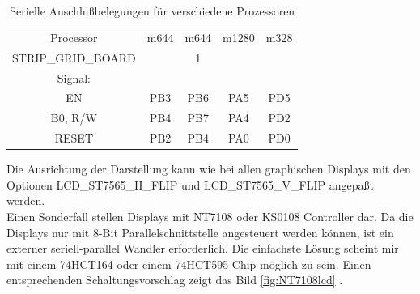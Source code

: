 \begin{table}[H]
  \begin{center}
    \begin{tabular}{| c || c | c | c | c |}
    \hline
 Processor  & m644  & m644 & m1280  & m328 \\
STRIP\_GRID\_BOARD &       &   1   &        &     \\
    \hline
    \hline
Signal:     &       &       &        &         \\
  EN        &  PB3  & PB6   &  PA5   & PD5     \\
    \hline
  B0, R/W   &  PB4  & PB7   &  PA4   & PD2      \\
    \hline
  RESET     &  PB2  & PB4   &  PA0   & PD0      \\
    \hline
    \end{tabular}
  \end{center}
  \caption{Serielle Anschlußbelegungen für verschiedene Prozessoren}
  \label{tab:ser-processor}
\end{table}

Die Ausrichtung der Darstellung kann wie bei allen graphischen Displays  mit den Optionen
LCD\_ST7565\-\_H\_FLIP und LCD\_ST7565\-\_V\_FLIP angepaßt werden. \\

Einen Sonderfall stellen Displays mit NT7108 oder KS0108 Controller dar. Da die Displays nur mit 8-Bit Parallelschnittstelle
angesteuert werden können, ist ein externer seriell-parallel Wandler erforderlich.
Die einfachste Lösung scheint mir mit einem 74HCT164 oder einem 74HCT595 Chip möglich zu sein.
Einen entsprechenden Schaltungsvorschlag zeigt das Bild \ref{fig:NT7108lcd} .

